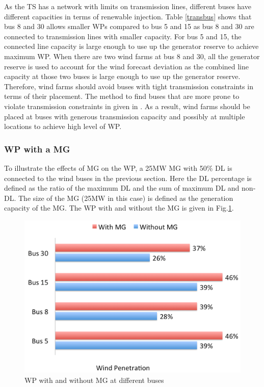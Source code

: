 As the TS has a network with limits on transmission lines, different buses have different capacities in terms of renewable injection. Table \ref{transbus} shows that bus 8 and 30 allows smaller WPs compared to bus 5 and 15 as bus 8 and 30 are connected to transmission lines with smaller capacity. For bus 5 and 15, the connected line capacity is large enough to use up the generator reserve to achieve maximum WP. When there are two wind farms at bus 8 and 30, all the generator reserve is used to account for the wind forecast deviation as the combined line capacity at those two buses is large enough to use up the generator reserve. Therefore, wind farms should avoid buses with tight transmission constraints in terms of their placement. The method to find buses that are more prone to violate transmission constraints in given in \cite{liu2016quantifying}. As a result, wind farms should be placed at buses with generous transmission capacity and possibly at multiple locations to achieve high level of WP.

\subsubsection{WP with a MG}
To illustrate the effects of MG on the WP, a 25MW MG with 50\% DL is connected to the wind buses in the previous section. Here the DL percentage is defined as the ratio of the maximum DL and the sum of maximum DL and non-DL. The size of the MG (25MW in this case) is defined as the generation capacity of the MG. The WP with and without the MG is given in Fig.\ref{fig:wp}.

\begin{figure}[H]
\centering
\includegraphics[scale=0.25]{windp.png}
\caption{WP with and without MG at different buses}
\label{fig:wp}
\end{figure}

